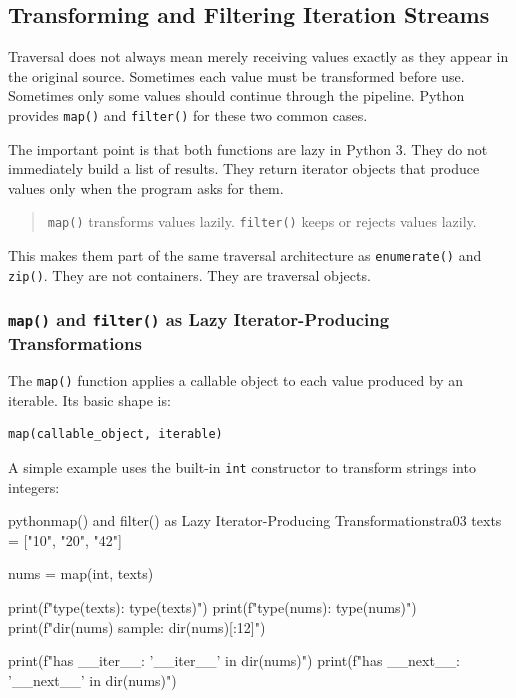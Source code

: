 \subsection{Transforming and Filtering Iteration Streams}

Traversal does not always mean merely receiving values exactly as they appear in the original source. Sometimes each value must be transformed before use. Sometimes only some values should continue through the pipeline. Python provides \texttt{map()} and \texttt{filter()} for these two common cases.

The important point is that both functions are lazy in Python 3. They do not immediately build a list of results. They return iterator objects that produce values only when the program asks for them.

\begin{quote}
\texttt{map()} transforms values lazily. \texttt{filter()} keeps or rejects values lazily.
\end{quote}

This makes them part of the same traversal architecture as \texttt{enumerate()} and \texttt{zip()}. They are not containers. They are traversal objects.

\subsubsection{\texttt{map()} and \texttt{filter()} as Lazy Iterator-Producing Transformations}

The \texttt{map()} function applies a callable object to each value produced by an iterable. Its basic shape is:

\begin{verbatim}
map(callable_object, iterable)
\end{verbatim}

A simple example uses the built-in \texttt{int} constructor to transform strings into integers:

\begin{codebox}[]{python}{map() and filter() as Lazy Iterator-Producing Transformations}{tra03}
texts = ["10", "20", "42"]

nums = map(int, texts)

print(f"type(texts): {type(texts)}")
print(f"type(nums): {type(nums)}")
print(f"dir(nums) sample: {dir(nums)[:12]}")

print(f"has __iter__: {'__iter__' in dir(nums)}")
print(f"has __next__: {'__next__' in dir(nums)}")
\end{codebox}


